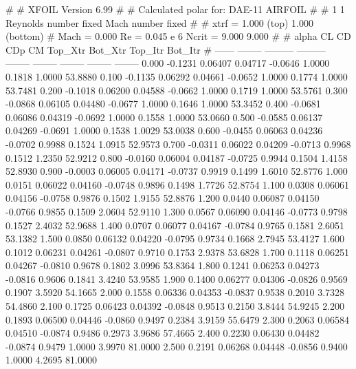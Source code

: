 #  
#       XFOIL         Version 6.99
#  
# Calculated polar for: DAE-11 AIRFOIL                                  
#  
# 1 1 Reynolds number fixed          Mach number fixed         
#  
# xtrf =   1.000 (top)        1.000 (bottom)  
# Mach =   0.000     Re =     0.045 e 6     Ncrit =   9.000  9.000
#  
#   alpha    CL        CD       CDp       CM     Top_Xtr  Bot_Xtr  Top_Itr  Bot_Itr
#  ------ -------- --------- --------- -------- -------- -------- -------- --------
   0.000  -0.1231   0.06407   0.04717  -0.0646   1.0000   0.1818   1.0000  53.8880
   0.100  -0.1135   0.06292   0.04661  -0.0652   1.0000   0.1774   1.0000  53.7481
   0.200  -0.1018   0.06200   0.04588  -0.0662   1.0000   0.1719   1.0000  53.5761
   0.300  -0.0868   0.06105   0.04480  -0.0677   1.0000   0.1646   1.0000  53.3452
   0.400  -0.0681   0.06086   0.04319  -0.0692   1.0000   0.1558   1.0000  53.0660
   0.500  -0.0585   0.06137   0.04269  -0.0691   1.0000   0.1538   1.0029  53.0038
   0.600  -0.0455   0.06063   0.04236  -0.0702   0.9988   0.1524   1.0915  52.9573
   0.700  -0.0311   0.06022   0.04209  -0.0713   0.9968   0.1512   1.2350  52.9212
   0.800  -0.0160   0.06004   0.04187  -0.0725   0.9944   0.1504   1.4158  52.8930
   0.900  -0.0003   0.06005   0.04171  -0.0737   0.9919   0.1499   1.6010  52.8776
   1.000   0.0151   0.06022   0.04160  -0.0748   0.9896   0.1498   1.7726  52.8754
   1.100   0.0308   0.06061   0.04156  -0.0758   0.9876   0.1502   1.9155  52.8876
   1.200   0.0440   0.06087   0.04150  -0.0766   0.9855   0.1509   2.0604  52.9110
   1.300   0.0567   0.06090   0.04146  -0.0773   0.9798   0.1527   2.4032  52.9688
   1.400   0.0707   0.06077   0.04167  -0.0784   0.9765   0.1581   2.6051  53.1382
   1.500   0.0850   0.06132   0.04220  -0.0795   0.9734   0.1668   2.7945  53.4127
   1.600   0.1012   0.06231   0.04261  -0.0807   0.9710   0.1753   2.9378  53.6828
   1.700   0.1118   0.06251   0.04267  -0.0810   0.9678   0.1802   3.0996  53.8364
   1.800   0.1241   0.06253   0.04273  -0.0816   0.9606   0.1841   3.4240  53.9585
   1.900   0.1400   0.06277   0.04306  -0.0826   0.9569   0.1907   3.5920  54.1665
   2.000   0.1558   0.06336   0.04353  -0.0837   0.9538   0.2010   3.7328  54.4860
   2.100   0.1725   0.06423   0.04392  -0.0848   0.9513   0.2150   3.8444  54.9245
   2.200   0.1893   0.06500   0.04446  -0.0860   0.9497   0.2384   3.9159  55.6479
   2.300   0.2063   0.06584   0.04510  -0.0874   0.9486   0.2973   3.9686  57.4665
   2.400   0.2230   0.06430   0.04482  -0.0874   0.9479   1.0000   3.9970  81.0000
   2.500   0.2191   0.06268   0.04448  -0.0856   0.9400   1.0000   4.2695  81.0000

